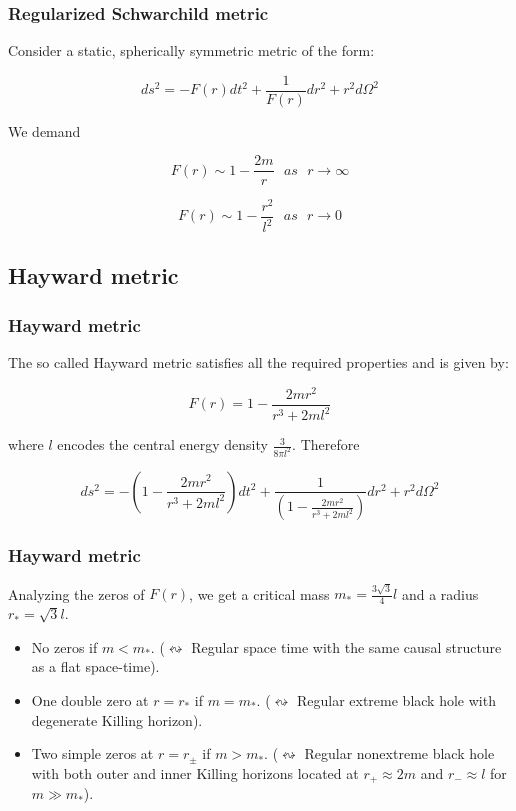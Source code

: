 \documentclass{beamer}
\begin{document}
\begin{frame}
\frametitle{Regularized Schwarchild metric}
Consider a static, spherically symmetric metric of the form:

\begin{equation}
ds^2 = -F(r)dt^2 + \frac{1}{F(r)}dr^2 + r^2d\Omega ^2
\end{equation}

We demand

\begin{equation}
F(r) \sim 1 - \frac{2m}{r}\ \ \ as\ \ \ r \rightarrow \infty
\end{equation}

\begin{equation}
F(r) \sim 1 - \frac{r^2}{l^2}\ \ \ as\ \ \ r \rightarrow 0
\end{equation}


\end{frame}

\subsection{Hayward metric}

\begin{frame}
\frametitle{Hayward metric}
The so called Hayward metric \cite{hayward} satisfies all the required properties and is given by:

\begin{equation}
F(r) = 1 - \frac{2mr^2}{r^3 + 2ml^2}
\end{equation}

where $l$ encodes the central energy density $\frac{3}{8\pi l^2}$. Therefore

\begin{equation}
ds^2 = -\left( 1 - \frac{2mr^2}{r^3 + 2ml^2} \right)dt^2 + \frac{1}{\left( 1 - \frac{2mr^2}{r^3 + 2ml^2} \right)}dr^2 + r^2d\Omega ^2
\end{equation}

\end{frame}


\begin{frame}
\frametitle{Hayward metric}

Analyzing the zeros of $F(r)$, we get a critical mass $m_{*} = \frac{3\sqrt{3}}{4}l$ and a radius $r_{*} = \sqrt{3}l$.

\begin{itemize}
\item No zeros if $m < m_{*}$. ($\leftrightsquigarrow$ Regular space time with the same causal structure as a flat space-time).
\item One double zero at $r = r_{*}$ if $m = m_{*}$.
($\leftrightsquigarrow$ Regular extreme black hole with degenerate Killing horizon).
\item Two simple zeros at $r = r_{\pm}$ if $m > m_{*}$.
($\leftrightsquigarrow$ Regular nonextreme black hole with both outer and inner Killing horizons located at $r_{+} \approx 2m$ and $r_{-} \approx l$ for $m \gg m_{*}$). %
\end{itemize}
\end{frame}
\end{document}
